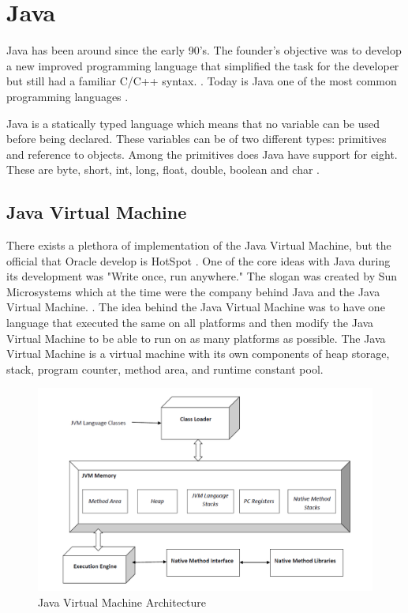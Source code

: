 \section{Java}
\label{JavaInstrumentation}
Java has been around since the early 90's. The founder's objective was to develop a new improved programming language that simplified the task for the developer but still had a familiar C/C++ syntax. \parencite{OracleVoice}. Today is Java one of the most common programming languages \parencite{octoverse}.

Java is a statically typed language which means that no variable can be used before being declared. These variables can be of two different types: primitives and reference to objects. Among the primitives does Java have support for eight. These are byte, short, int, long, float, double, boolean and char \parencite{primjav}.



\subsection{Java Virtual Machine}
There exists a plethora of implementation of the Java Virtual Machine, but the official that Oracle develop is HotSpot \parencite{hotSpot}. One of the core ideas with Java during its development was "Write once, run anywhere." The slogan was created by Sun Microsystems which at the time were the company behind Java and the Java Virtual Machine. \parencite{Craig_2006}. The idea behind the Java Virtual Machine was to have one language that executed the same on all platforms and then modify the Java Virtual Machine to be able to run on as many platforms as possible. The Java Virtual Machine is a virtual machine with its own components of heap storage, stack, program counter, method area, and runtime constant pool.

\begin{figure}[H]
    \centering
    \includegraphics[width=\textwidth]{images/JvmSpec7.png}
    \caption{Java Virtual Machine Architecture}
    \label{fig:JVM}
\end{figure}

